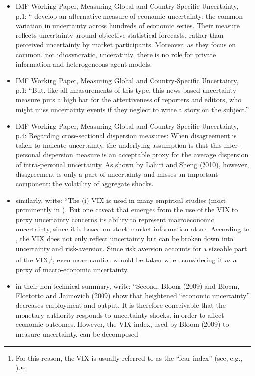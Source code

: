 \documentclass[a4paper,11pt,listof=nochaptergap,oneside,pointednumbers,bibtotoc,bigheadings,liststotoc]{scrbook}
\theoremstyle{mysatz}
\theoremstyle{mydefinition}
\theoremstyle{mybemerkung}
\begin{document}
\begin{itemize}
	\item IMF Working Paper, Measuring Global and Country-Specific Uncertainty, p.1: ``\citet{juradoetal:15} develop an alternative measure of economic uncertainty: the common variation in uncertainty across hundreds of economic series. Their measure reflects uncertainty around objective statistical forecasts, rather than perceived uncertainty by market participants. Moreover, as they focus on common, not idiosyncratic, unceratinty, there is no role for private information and heterogeneous agent models.
	\item IMF Working Paper, Measuring Global and Country-Specific Uncertainty, p.1: ``But, like all measurements of this type, this news-based uncertainty measure puts a high bar for the attentiveness of reporters and editors, who might miss uncertainty events if they neglect to write a story on the subject.'' 
	\item IMF Working Paper, Measuring Global and Country-Specific Uncertainty, p.4: Regarding cross-sectional dispersion measures: When disagreement is taken to indicate uncertainty, the underlying assumption is that this inter-personal dispersion measure is an acceptable proxy for the average dispersion of intra-personal uncertainty. As shown by Lahiri and Sheng (2010), however, disagreement is only a part of uncertainty and misses an important component: the volatility of aggregate shocks.
		\item similarly, \citet[p. 12]{bontempietal:16} write: ``The (i) VIX is used in many empirical studies (most prominently in \citet{bloom:09}). But one caveat that emerges from the use of the VIX to proxy uncertainty concerns its ability to represent macroeconomic uncertainty, since it is based on stock market information alone. According to \citet{bekaertetal:13}, the VIX does not only reflect uncertainty but can be broken down into uncertainty and risk-aversion. Since risk aversion accounts for a sizeable part of the VIX,\footnote{For this reason, the VIX is usually referred to as the ``fear index'' (see, e.g., \citet{whaley:00}).}, even more caution should be taken when considering it as a proxy of macro-economic uncertainty.
	\item in their non-technical summary, \citet{bekaertetal:13} write: ``Second, Bloom (2009) and Bloom, Floetotto and Jaimovich (2009) show that heightened
“economic uncertainty” decreases employment and output. It is therefore conceivable that the
monetary authority responds to uncertainty shocks, in order to affect economic outcomes.
However, the VIX index, used by Bloom (2009) to measure uncertainty, can be decomposed

\end{itemize}
\end{document}
